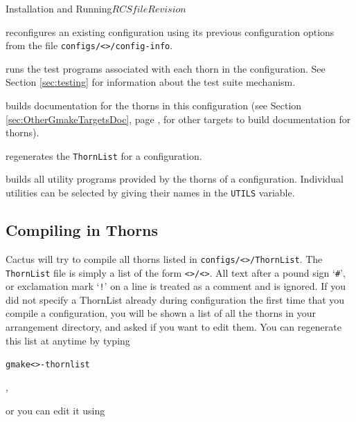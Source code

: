 \begin{cactuspart}{Installation and Running}{$RCSfile$}{$Revision$}
\begin{Lentry}
\item [\texttt{gmake <\var{config}>-reconfig}] reconfigures an existing
configuration using its previous configuration options from the file
\texttt{configs/<>/config-info}.

\item [\texttt{gmake <\var{config}>--testsuite}] runs the test programs
associated with each thorn in the configuration. See Section
\ref{sec:testing} for information about the test suite mechanism.

\item[\texttt{gmake <\var{config}>-ThornGuide}] builds documentation for the
thorns in this configuration
  (see Section \ref{sec:OtherGmakeTargetsDoc}, page
  \pageref{sec:OtherGmakeTargetsDoc}, for other targets to build documentation
  for thorns).

\item [\texttt{gmake <\var{config}>-thornlist}] regenerates the
\texttt{ThornList} for a configuration.

\item [\texttt{gmake <\var{config}>-utils [UTILS$=$<\var{list}>]}] builds all
utility programs provided by the thorns of a configuration. Individual
utilities can be selected by giving their names in the \texttt{UTILS} variable.

\end{Lentry}



\subsection{Compiling in Thorns}
\label{sec:cointh}

Cactus will try to compile all thorns listed in
\texttt{configs/<>/ThornList}.
The \texttt{ThornList} file is simply a list of the form
\texttt{<>/<>}.  All text after a pound sign
`\texttt{\#}', or exclamation mark `\texttt{!}'
on a line is treated as a comment and is ignored. If you did
not specify a ThornList already during configuration the first time that you compile a configuration, you will be shown a list of all the thorns in your arrangement
directory, and asked if you want to edit them. You can regenerate
this list at anytime by typing

\begin{alltt}
gmake <>-thornlist
\end{alltt},

or you can edit it using


\end{cactuspart}
